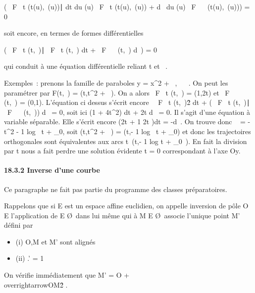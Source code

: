 \documentclass[]{article}
\begin{document}
\left ( \partial~F \over \partial~t
(t(u),\lambda~(u))∣ dt \over du
(u) \partial~F \over \partial~t (t(u),\lambda~(u)) + d\lambda~
\over du (u) \partial~F \over \partial~\lambda~
(t(u),\lambda~(u))\right ) = 0

soit encore, en termes de formes différentielles

\left ( \partial~F \over \partial~t
(t,\lambda~)∣ \partial~F \over \partial~t (t,\lambda~)
dt + \partial~F \over \partial~\lambda~ (t,\lambda~) d\lambda~\right ) = 0

qui conduit à une équation différentielle reliant t et \lambda~.

Exemples~: prenons la famille de paraboles y = x^2 + \lambda~, \lambda~ \in
{}~. On peut les paramétrer par F(t,\lambda~) = (t,t^2 + \lambda~). On a
alors  \partial~F \over \partial~t (t,\lambda~) = (1,2t) et  \partial~F
\over \partial~\lambda~ (t,\lambda~) = (0,1). L'équation ci dessus s'écrit
encore \ \partial~F \over \partial~t
(t,\lambda~)\^2 dt + \left
( \partial~F \over \partial~t (t,\lambda~)∣ \partial~F
\over \partial~\lambda~ (t,\lambda~)\right ) d\lambda~ = 0, soit ici
(1 + 4t^2) dt + 2t d\lambda~ = 0. Il s'agit d'une équation à
variable séparable. Elle s'écrit encore (2t + 1 \over
2t )dt = -d\lambda~. On trouve donc \lambda~ = -t^2 - 1
  log~
t + \lambda_0, soit (t,t^2 + \lambda~) =
(t,- 1   log~
t + \lambda_0) et donc les trajectoires
orthogonales sont équivalentes aux arcs
t\mapsto~(t,- 1 
 log t + \lambda_0~). En fait la division
par t nous a fait perdre une solution évidente t = 0 correspondant à
l'axe Oy.

\paragraph{18.3.2 Inverse d'une courbe}

Ce paragraphe ne fait pas partie du programme des classes préparatoires.

Rappelons que si E est un espace affine euclidien, on appelle inversion
de pôle O \in E l'application de E \diagdown\O\
dans lui même qui à M \in E \diagdown\O\ associe
l'unique point M' défini par

\begin{itemize}
\itemsep1pt\parskip0pt
\item
  (i) O,M et M' sont alignés
\item
  (ii) \overlineOM.\overlineOM' =
  1
\end{itemize}

On vérifie immédiatement que M' = O +
\overrightarrowOM \over
\\overrightarrowOM\^2
.
\end{document}
